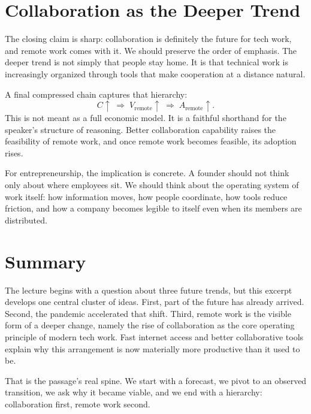 \section{Collaboration as the Deeper Trend}

The closing claim is sharp: collaboration is definitely the future for tech work, and remote work comes with it. We should preserve the order of emphasis. The deeper trend is not simply that people stay home. It is that technical work is increasingly organized through tools that make cooperation at a distance natural.

A final compressed chain captures that hierarchy:
\begin{equation}
C \uparrow \;\Rightarrow\; V_{\mathrm{remote}} \uparrow \;\Rightarrow\; A_{\mathrm{remote}} \uparrow .
\end{equation}
This is not meant as a full economic model. It is a faithful shorthand for the speaker's structure of reasoning. Better collaboration capability raises the feasibility of remote work, and once remote work becomes feasible, its adoption rises.

For entrepreneurship, the implication is concrete. A founder should not think only about where employees sit. We should think about the operating system of work itself: how information moves, how people coordinate, how tools reduce friction, and how a company becomes legible to itself even when its members are distributed.

\section{Summary}

The lecture begins with a question about three future trends, but this excerpt develops one central cluster of ideas. First, part of the future has already arrived. Second, the pandemic accelerated that shift. Third, remote work is the visible form of a deeper change, namely the rise of collaboration as the core operating principle of modern tech work. Fast internet access and better collaborative tools explain why this arrangement is now materially more productive than it used to be.

That is the passage's real spine. We start with a forecast, we pivot to an observed transition, we ask why it became viable, and we end with a hierarchy: collaboration first, remote work second.